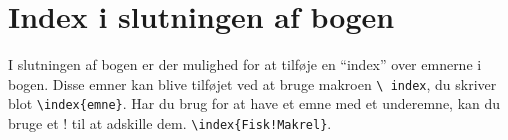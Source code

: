 \section{Index i slutningen af bogen}
I slutningen af bogen er der mulighed for at tilføje en ``index'' over emnerne 
i bogen.
Disse emner kan blive tilføjet ved at bruge makroen \texttt{\textbackslash 
index}, du skriver blot \texttt{\textbackslash index\{emne\}}. Har du brug for 
at have et emne med et underemne, kan du bruge et ! til at adskille dem. 
\texttt{\textbackslash index\{Fisk!Makrel\}}.